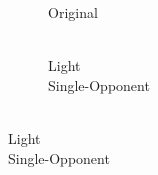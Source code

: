\documentclass[journal,onecolumn]{IEEEtran}
\begin{document}
\begin{figure}[h]
    \centering
    \begin{subfigure}{0.3\textwidth}
        \captionsetup{justification=centering}
        \caption{Original}
    \end{subfigure}%
    \par \bigskip%
    \begin{subfigure}{0.15\textwidth}
        \centering
        \captionsetup{justification=centering}
        \caption{\\ Light\\ Single-Opponent}

\end{subfigure}
\end{figure}
\end{document}
